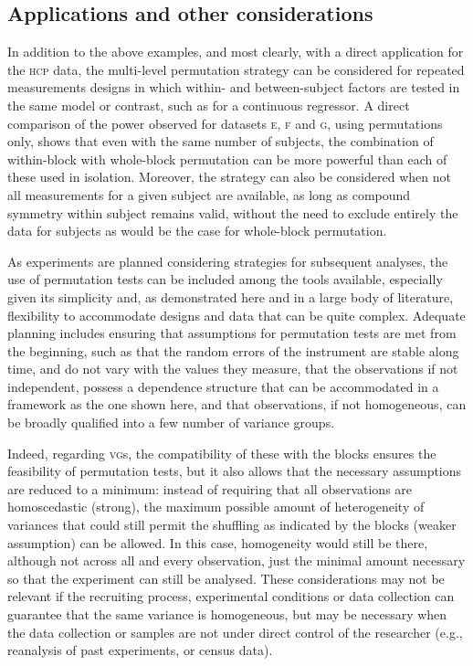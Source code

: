 \subsection{Applications and other considerations}

In addition to the above examples, and most clearly, with a direct application for the \textsc{hcp} data, the multi-level permutation strategy can be considered for repeated measurements designs in which within- and between-subject factors are tested in the same model or contrast, such as for a continuous regressor. A direct comparison of the power observed for datasets \textsc{e}, \textsc{f} and \textsc{g}, using permutations only, shows that even with the same number of subjects, the combination of within-block with whole-block permutation can be more powerful than each of these used in isolation. Moreover, the strategy can also be considered when not all measurements for a given subject are available, as long as compound symmetry within subject remains valid, without the need to exclude entirely the data for subjects as would be the case for whole-block permutation.

As experiments are planned considering strategies for subsequent analyses, the use of permutation tests can be included among the tools available, especially given its simplicity and, as demonstrated here and in a large body of literature, flexibility to accommodate designs and data that can be quite complex. Adequate planning includes ensuring that assumptions for permutation tests are met from the beginning, such as that the random errors of the instrument are stable along time, and do not vary with the values they measure, that the observations if not independent, possess a dependence structure that can be accommodated in a framework as the one shown here, and that observations, if not homogeneous, can be broadly qualified into a few number of variance groups.

Indeed, regarding \textsc{vg}s, the compatibility of these with the blocks ensures the feasibility of permutation tests, but it also allows that the necessary assumptions are reduced to a minimum: instead of requiring that all observations are homoscedastic (strong), the maximum possible amount of heterogeneity of variances that could still permit the shuffling as indicated by the blocks (weaker assumption) can be allowed. In this case, homogeneity would still be there, although not across all and every observation, just the minimal amount necessary so that the experiment can still be analysed. These considerations may not be relevant if the recruiting process, experimental conditions or data collection can guarantee that the same variance is homogeneous, but may be necessary when the data collection or samples are not under direct control of the researcher (e.g., reanalysis of past experiments, or census data).

